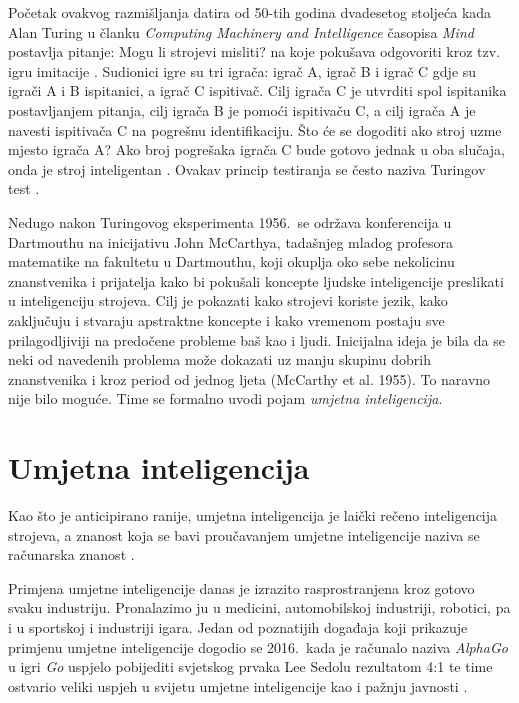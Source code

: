 \documentclass[times, utf8, zavrsni]{fer}
\begin{document}
Početak ovakvog razmišljanja datira od 50-tih godina dvadesetog stoljeća kada Alan Turing u članku \textit{Computing Machinery and Intelligence} časopisa \textit{Mind} postavlja pitanje: Mogu li strojevi misliti?  na koje pokušava odgovoriti kroz tzv. igru imitacije . Sudionici igre su tri igrača: igrač A, igrač B i igrač C gdje su igrači A i B ispitanici, a igrač C ispitivač. Cilj igrača C je utvrditi spol ispitanika postavljanjem pitanja, cilj igrača B je pomoći ispitivaču C, a cilj igrača A je navesti ispitivača C na pogrešnu identifikaciju. Što će se dogoditi ako stroj uzme mjesto igrača A? Ako broj pogrešaka igrača C bude gotovo jednak u oba slučaja, onda je stroj inteligentan \citep{turingAI}. Ovakav princip testiranja se često naziva Turingov test .

Nedugo nakon Turingovog eksperimenta 1956.\ se održava konferencija u Dartmouthu \citep{wiki:DART} na inicijativu John McCarthya, tadašnjeg mladog profesora matematike na fakultetu u Dartmouthu, koji okuplja oko sebe nekolicinu znanstvenika i prijatelja kako bi pokušali koncepte ljudske inteligencije preslikati u inteligenciju strojeva. Cilj je pokazati kako strojevi koriste jezik, kako zaključuju i stvaraju apstraktne koncepte i kako vremenom postaju sve prilagodljiviji na predočene probleme baš kao i ljudi. Inicijalna ideja je bila da se neki od navedenih problema može dokazati uz manju skupinu dobrih znanstvenika i kroz period od jednog ljeta (McCarthy et al. 1955). To naravno nije bilo moguće. Time se formalno uvodi pojam \textit{umjetna inteligencija}.

\section{Umjetna inteligencija}
Kao što je anticipirano ranije, umjetna inteligencija  je laički rečeno inteligencija strojeva, a znanost koja se bavi proučavanjem umjetne inteligencije naziva se računarska znanost .

Primjena umjetne inteligencije danas je izrazito rasprostranjena kroz gotovo svaku industriju. Pronalazimo ju u medicini, automobilskoj industriji, robotici, pa i u sportskoj i industriji igara. Jedan od poznatijih događaja koji prikazuje primjenu umjetne inteligencije dogodio se 2016.\ kada je računalo naziva \textit{AlphaGo} u igri \textit{Go} uspjelo pobijediti svjetskog prvaka Lee Sedolu rezultatom 4:1 te time ostvario veliki uspjeh u svijetu umjetne inteligencije kao i pažnju javnosti \citep{moyerGO}.
\end{document}
